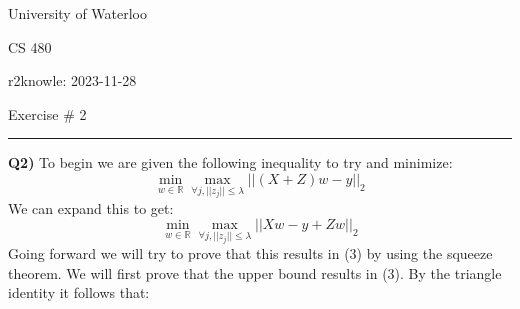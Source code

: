 \documentclass{article}
\begin{document}
\begin{titlepage}
	\setlength{\parindent}{0pt}
	\large

\vspace*{-2cm}



University of Waterloo \par
CS 480 \par
\vspace{0.05cm}
r2knowle: 2023-11-28
\vspace{0.2cm}

{\huge Exercise \# 2 \par}
\hrule

\vspace{0.5cm}
\textbf{Q2)} To begin we are given the following inequality to try and minimize:
\[ \min_{w \in \mathbb{R}} \max_{\forall j, ||z_j|| \leq \lambda} ||(X+Z)w - y ||_2 \]
We can expand this to get:
\[ \min_{w \in \mathbb{R}} \max_{\forall j, ||z_j|| \leq \lambda} ||Xw - y + Zw ||_2 \]
Going forward we will try to prove that this results in (3) by using the squeeze theorem. We will first prove that the upper bound results in (3). By the triangle identity it follows that:


\end{titlepage}
\end{document}
